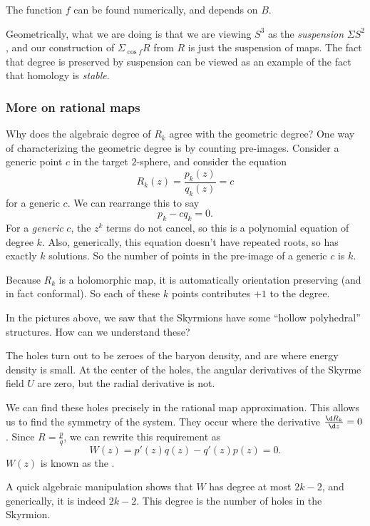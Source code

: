 \documentclass[a4paper]{article}
\begin{document}
The function $f$ can be found numerically, and depends on $B$.

Geometrically, what we are doing is that we are viewing $S^3$ as the \emph{suspension} $\Sigma S^2$, and our construction of $\Sigma_{\cos f} R$ from $R$ is just the suspension of maps. The fact that degree is preserved by suspension can be viewed as an example of the fact that homology is \emph{stable}.

\subsubsection*{More on rational maps}
Why does the algebraic degree of $R_k$ agree with the geometric degree? One way of characterizing the geometric degree is by counting pre-images. Consider a generic point $c$ in the target $2$-sphere, and consider the equation
\[
  R_k(z) = \frac{p_k(z)}{q_k(z)} = c
\]
for a generic $c$. We can rearrange this to say
\[
  p_k - c q_k = 0.
\]
For a \emph{generic} $c$, the $z^k$ terms do not cancel, so this is a polynomial equation of degree $k$. Also, generically, this equation doesn't have repeated roots, so has exactly $k$ solutions. So the number of points in the pre-image of a generic $c$ is $k$.

Because $R_k$ is a holomorphic map, it is automatically orientation preserving (and in fact conformal). So each of these $k$ points contributes $+1$ to the degree.

In the pictures above, we saw that the Skyrmions have some ``hollow polyhedral'' structures. How can we understand these?

The holes turn out to be zeroes of the baryon density, and are where energy density is small. At the center of the holes, the angular derivatives of the Skyrme field $U$ are zero, but the radial derivative is not. %

We can find these holes precisely in the rational map approximation. This allows us to find the symmetry of the system. They occur where the derivative $\frac{\d R_k}{\d z} = 0$. Since $R = \frac{p}{q}$, we can rewrite this requirement as
\[
  W(z) = p'(z) q(z) - q'(z) p(z) = 0.
\]
$W(z)$ is known as the .

A quick algebraic manipulation shows that $W$ has degree at most $2k - 2$, and generically, it is indeed $2k - 2$. This degree is the number of holes in the Skyrmion.
\end{document}
